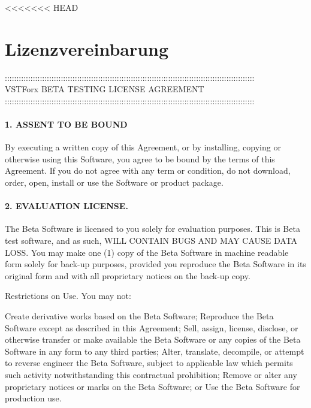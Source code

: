 <<<<<<< HEAD
\section{Lizenzvereinbarung}

\begin{center}
:::::::::::::::::::::::::::::::::::::::::::::::::::::::::::::::::::::::::::::::::::::::::::::::::::::::::::\\
VSTForx BETA TESTING LICENSE AGREEMENT\\
:::::::::::::::::::::::::::::::::::::::::::::::::::::::::::::::::::::::::::::::::::::::::::::::::::::::::::\\
\end{center}
\paragraph{1. ASSENT TO BE BOUND}

By executing a written copy of this Agreement, or by installing, copying or otherwise using this Software, you agree to be bound by the terms of this Agreement. If you do not agree with any term or condition, do not download, order, open, install or use the Software or product package.

\paragraph{2. EVALUATION LICENSE.}

The Beta Software is licensed to you solely for evaluation purposes. This is Beta test software, and as such, WILL CONTAIN BUGS AND MAY CAUSE DATA LOSS. You may make one (1) copy of the Beta Software in machine readable form solely for back-up purposes, provided you reproduce the Beta Software in its original form and with all proprietary notices on the back-up copy.

Restrictions on Use. You may not:

Create derivative works based on the Beta Software;
Reproduce the Beta Software except as described in this Agreement;
Sell, assign, license, disclose, or otherwise transfer or make available the Beta Software or any copies of the Beta Software in any form to any third parties;
Alter, translate, decompile, or attempt to reverse engineer the Beta Software, subject to applicable law which permits such activity notwithstanding this contractual prohibition;
Remove or alter any proprietary notices or marks on the Beta Software; or
Use the Beta Software for production use.


